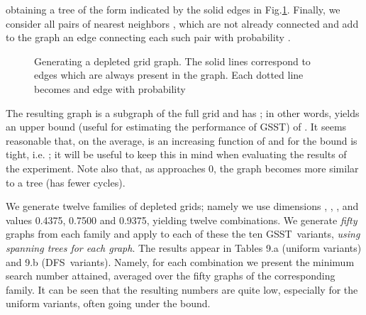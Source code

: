 \documentclass[11pt]{article}\usepackage{amsmath}
\begin{document}
\noindent obtaining a tree of the form indicated by the solid edges in
Fig.\ref{fig18}. Finally, we consider all pairs of nearest neighbors ,  which are not already
connected and add to the graph an edge connecting each such pair with
probability .

\begin{figure}[h]
\centering{}\caption{Generating a
depleted grid graph. The solid lines correspond to edges which are always
present in the graph. Each dotted line becomes and edge with probability }\label{fig18}\end{figure}

The resulting graph  is a subgraph of the full 
grid and has ; in other words, 
yields an upper bound (useful for estimating the performance of GSST) of
. It seems reasonable that, on the
average,  is an increasing function of
 and for  the bound is tight, i.e. ; it will be useful to keep this in
mind when evaluating the results of the experiment. Note also that, as 
approaches 0, the graph becomes more similar to a tree (has fewer cycles).

We generate twelve families of depleted grids; namely we use dimensions
, , ,  and  values 0.4375, 0.7500
and 0.9375, yielding twelve combinations. We generate \emph{fifty }graphs from
each family and apply to each of these the ten GSST\ variants, \emph{using
}\emph{ spanning trees for each graph}. The results appear in
Tables 9.a (uniform variants) and 9.b (DFS\ variants). Namely, for each
combination we present the minimum search number attained, averaged over the
fifty graphs of the corresponding family. It can be seen that the resulting
numbers are quite low, especially for the uniform variants, often going under
the  bound.
\end{document}
